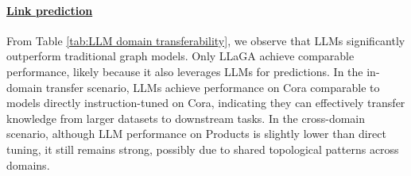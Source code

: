 \paragraph{\underline{Link prediction}}

From Table \ref{tab:LLM domain transferability}, we observe that LLMs significantly outperform traditional graph models. Only LLaGA achieve comparable performance, likely because it also leverages LLMs for predictions. 
In the in-domain transfer scenario, LLMs achieve performance on Cora comparable to models directly instruction-tuned on Cora, indicating they can effectively transfer knowledge from larger datasets to downstream tasks. In the cross-domain scenario, although LLM performance on Products is slightly lower than direct tuning, it still remains strong, possibly due to shared topological patterns across domains.



